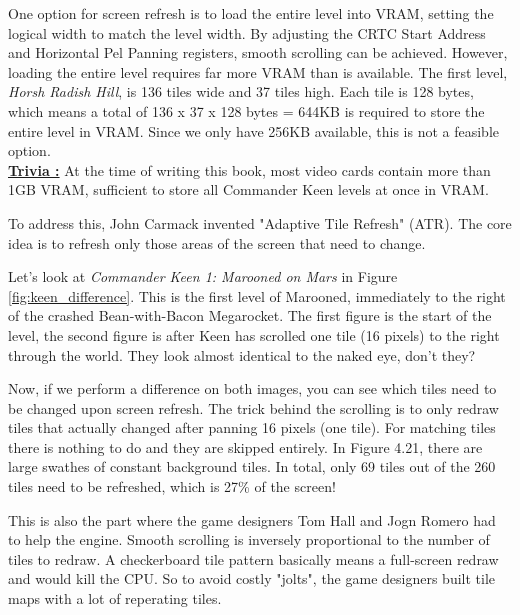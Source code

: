 \documentclass[book.tex]{subfiles}
\begin{document}
\par
One option for screen refresh is to load the entire level into VRAM, setting the logical width to match the level width. By adjusting the CRTC Start Address and Horizontal Pel Panning registers, smooth scrolling can be achieved. However, loading the entire level requires far more VRAM than is available. The first level, \textit{Horsh Radish Hill}, is 136 tiles wide and 37 tiles high. Each tile is 128 bytes,  which means a total of 136 x 37 x 128 bytes = 644KB is required to store the entire level in VRAM. Since we only have 256KB available, this is not a feasible option.\\

\textbf{\underline{Trivia :}} At the time of writing this book, most video cards contain more than 1GB VRAM,  sufficient to store all Commander Keen levels at once in VRAM. \\

\par
To address this, John Carmack invented "Adaptive Tile Refresh" (ATR). The core idea is to refresh only those areas of the screen that need to change. \\

\par
Let's look at \textit{Commander Keen 1: Marooned on Mars} in Figure \ref{fig:keen_difference}. This is the first level of Marooned, immediately to the right of the crashed Bean-with-Bacon Megarocket. The first figure is the start of the level, the second figure is after Keen has scrolled one tile (16 pixels) to the right through the world. They look almost identical to the naked eye, don't they? \\

\par
Now, if we perform a difference on both images, you can see which tiles need to be changed upon screen refresh. The trick behind the scrolling is to only redraw tiles that actually changed after panning 16 pixels (one tile). For matching tiles there is nothing to do and they are skipped entirely. In Figure 4.21, there are large swathes of constant background tiles. In total, only 69 tiles out of the 260 tiles need to be refreshed, which is 27\% of the screen!\\

\par
This is also the part where the game designers Tom Hall and Jogn Romero had to help the engine. Smooth scrolling is inversely proportional to the number of tiles to redraw. A checkerboard tile pattern basically means a full-screen redraw and would kill the CPU. So to avoid costly "jolts", the game designers built tile maps with a lot of reperating tiles. \\
\end{document}
